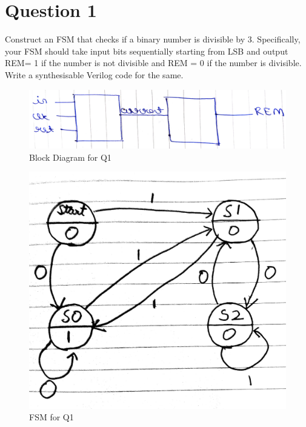 \documentclass[11pt,a4paper]{article}
\begin{document}
	\cleardoublepage
	
	
	\thispagestyle{empty}
	
	\section*{Question 1}
	Construct an FSM that checks if a binary number is divisible by 3. Specifically, your FSM should take input bits sequentially starting from LSB and output REM= 1 if the number is not divisible and REM = 0 if the number is divisible. Write a synthesisable Verilog code for the same.
	\begin{figure}[H]
		\centering
		\includegraphics[width=1\linewidth]{images/q1blockdiag}
		\caption[]{Block Diagram for Q1}
		\label{fig:q1blck}
	\end{figure}
	\begin{figure}[H]
		\centering
		\includegraphics[scale=0.1]{images/q1fsm}
		\caption[]{FSM for Q1}
		\label{fig:q1fsm}
	\end{figure}
	
	
\end{document}
